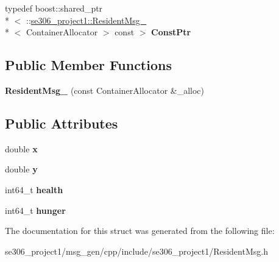 \begin{DoxyCompactItemize}
\item 
\hypertarget{structse306__project1_1_1ResidentMsg___a303bbdaa992130e86797f04c3754c962}{typedef boost\-::shared\-\_\-ptr\\*
$<$ \-::\hyperlink{structse306__project1_1_1ResidentMsg__}{se306\-\_\-project1\-::\-Resident\-Msg\-\_\-}\\*
$<$ Container\-Allocator $>$ const  $>$ {\bfseries Const\-Ptr}}\label{structse306__project1_1_1ResidentMsg___a303bbdaa992130e86797f04c3754c962}

\end{DoxyCompactItemize}
\subsection*{Public Member Functions}
\begin{DoxyCompactItemize}
\item 
\hypertarget{structse306__project1_1_1ResidentMsg___acd6d23f75b6ac337376a428469ba11f3}{{\bfseries Resident\-Msg\-\_\-} (const Container\-Allocator \&\-\_\-alloc)}\label{structse306__project1_1_1ResidentMsg___acd6d23f75b6ac337376a428469ba11f3}

\end{DoxyCompactItemize}
\subsection*{Public Attributes}
\begin{DoxyCompactItemize}
\item 
\hypertarget{structse306__project1_1_1ResidentMsg___a9d401692ae2b3cf97df1c901db0d7de2}{double {\bfseries x}}\label{structse306__project1_1_1ResidentMsg___a9d401692ae2b3cf97df1c901db0d7de2}

\item 
\hypertarget{structse306__project1_1_1ResidentMsg___a3203d10e04f6516f90adff9fb2385ae7}{double {\bfseries y}}\label{structse306__project1_1_1ResidentMsg___a3203d10e04f6516f90adff9fb2385ae7}

\item 
\hypertarget{structse306__project1_1_1ResidentMsg___ade77386ea400ac15afb1a5a4c7634a0c}{int64\-\_\-t {\bfseries health}}\label{structse306__project1_1_1ResidentMsg___ade77386ea400ac15afb1a5a4c7634a0c}

\item 
\hypertarget{structse306__project1_1_1ResidentMsg___a9596980bc50230804305410bd60bc48e}{int64\-\_\-t {\bfseries hunger}}\label{structse306__project1_1_1ResidentMsg___a9596980bc50230804305410bd60bc48e}

\end{DoxyCompactItemize}


The documentation for this struct was generated from the following file\-:\begin{DoxyCompactItemize}
\item 
se306\-\_\-project1/msg\-\_\-gen/cpp/include/se306\-\_\-project1/Resident\-Msg.\-h\end{DoxyCompactItemize}
